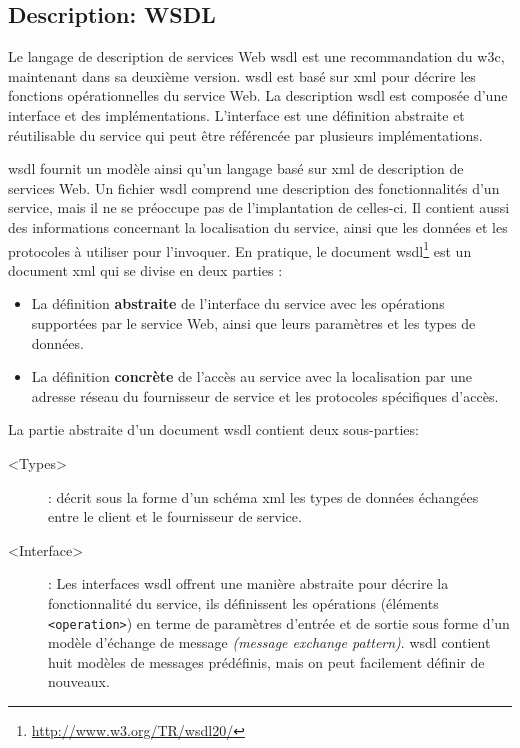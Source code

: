   \subsection{Description: WSDL}
  \label{sec:wsdl}
  Le langage de description de services Web \acrshort{wsdl}
  \cite{christensen2001web, chinnici2007web} est une recommandation du
  \acrshort{w3c}, maintenant dans sa deuxième version.
  \acrshort{wsdl} est basé sur \acrshort{xml} pour décrire les
  fonctions opérationnelles du service Web. La description
  \acrshort{wsdl} est composée d'une interface et des
  implémentations. L'interface est une définition abstraite et
  réutilisable du service qui peut être référencée par plusieurs
  implémentations.\medskip

  \acrshort{wsdl} fournit un modèle ainsi qu'un langage basé sur
  \acrshort{xml} de description de services Web. Un fichier
  \acrshort{wsdl} comprend une description des fonctionnalités d'un
  service, mais il ne se préoccupe pas de l'implantation de celles-ci.
  Il contient aussi des informations concernant la localisation du
  service, ainsi que les données et les protocoles à utiliser pour
  l'invoquer. En pratique, le document
  \acrshort{wsdl}\footnote{\url{http://www.w3.org/TR/wsdl20/}} est un
  document \acrshort{xml} qui se divise en deux parties
  \cite{elie2010}:\medskip

  \medskip

  \SpecialItem
  \begin{itemize}
  \item La définition \textbf{abstraite} de l'interface du service
    avec les opérations supportées par le service Web, ainsi que leurs
    paramètres et les types de données.

  \item La définition \textbf{concrète} de l'accès au service avec la
    localisation par une adresse réseau du fournisseur de service et
    les protocoles spécifiques d'accès.\medskip
  \end{itemize}
  \enddescription

  La partie abstraite d'un document \acrshort{wsdl} contient deux
  sous-parties:\medskip

  \renewcommand{\descriptionlabel}[1]{\hspace{0.5cm}\textbullet~\texttt{#1}}
  \begin{description}
  \item[<Types>]: décrit sous la forme d'un schéma \acrshort{xml} les
    types de données échangées entre le client et le fournisseur de
    service.

  \item[<Interface>]: Les interfaces \acrshort{wsdl} offrent une
    manière abstraite pour décrire la fonctionnalité du service, ils
    définissent les opérations (éléments \texttt{<operation>}) en terme de
    paramètres d'entrée et de sortie sous forme d'un modèle
    d'échange de message \textit{(message exchange
      pattern)}. \acrshort{wsdl} contient huit modèles de messages
    prédéfinis, mais on peut facilement définir de nouveaux.\medskip
  \end{description}
  \enddescription

